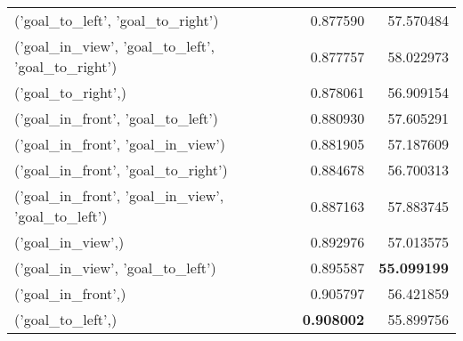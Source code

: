\begin{tabular}{lrr}
('goal\_to\_left', 'goal\_to\_right') & 0.877590 & 57.570484 \\
('goal\_in\_view', 'goal\_to\_left', 'goal\_to\_right') & 0.877757 & 58.022973 \\
('goal\_to\_right',) & 0.878061 & 56.909154 \\
('goal\_in\_front', 'goal\_to\_left') & 0.880930 & 57.605291 \\
('goal\_in\_front', 'goal\_in\_view') & 0.881905 & 57.187609 \\
('goal\_in\_front', 'goal\_to\_right') & 0.884678 & 56.700313 \\
('goal\_in\_front', 'goal\_in\_view', 'goal\_to\_left') & 0.887163 & 57.883745 \\
('goal\_in\_view',) & 0.892976 & 57.013575 \\
('goal\_in\_view', 'goal\_to\_left') & 0.895587 & \color{f_darkred} \bfseries 55.099199 \\
('goal\_in\_front',) & 0.905797 & 56.421859 \\
('goal\_to\_left',) & \color{f_green} \bfseries 0.908002 & 55.899756 \\
\bottomrule
\end{tabular}
